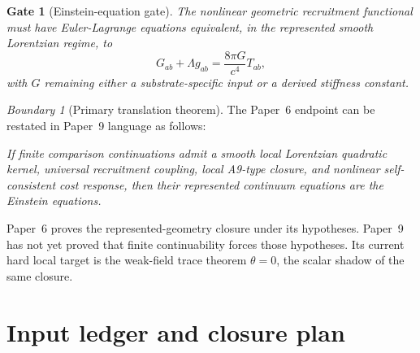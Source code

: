 \documentclass[11pt]{article}
\newtheorem{gate}[theorem]{Gate}
\theoremstyle{remark}
\newtheorem{warning}[theorem]{Boundary}
\begin{document}
\begin{gate}[Einstein-equation gate]
The nonlinear geometric recruitment functional must have Euler-Lagrange equations equivalent, in the represented smooth Lorentzian regime, to
\[
        G_{ab}+\Lambda g_{ab}=\frac{8\pi G}{c^4}T_{ab},
\]
with \(G\) remaining either a substrate-specific input or a derived stiffness constant.
\end{gate}

\begin{warning}[Primary translation theorem]
The Paper~6 endpoint can be restated in Paper~9 language as follows:

\emph{If finite comparison continuations admit a smooth local Lorentzian quadratic kernel, universal recruitment coupling, local A9-type closure, and nonlinear self-consistent cost response, then their represented continuum equations are the Einstein equations.}

Paper~6 proves the represented-geometry closure under its hypotheses.  Paper~9 has not yet proved that finite continuability forces those hypotheses.  Its current hard local target is the weak-field trace theorem \(\theta=0\), the scalar shadow of the same closure.
\end{warning}

\section{Input ledger and closure plan}
\end{document}
